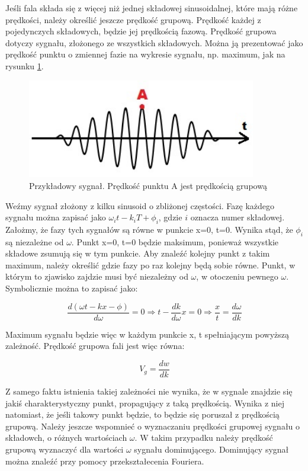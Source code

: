 Jeśli fala składa się z więcej niż jednej składowej sinusoidalnej, które mają różne prędkości, należy określić jeszcze prędkość grupową.  Prędkość każdej z pojedynczych składowych, będzie jej prędkością fazową. Prędkość grupowa dotyczy sygnału, złożonego ze wszystkich składowych. Można ją prezentować jako prędkość punktu o zmiennej fazie na wykresie sygnału, np. maximum, jak na rysunku \ref{fig:przykladowy_sygnal}.

\begin{figure}[h]
\centering
\includegraphics[width=10cm]{Zdjecia/2/predkosc_grupowa_wierzcholek}
\caption{Przykładowy sygnał. Prędkość punktu A jest prędkością grupową}
\label{fig:przykladowy_sygnal}
\end{figure}

Weźmy sygnał złożony z kilku sinusoid o zbliżonej częstości. Fazę każdego sygnału można zapisać jako \( \omega_i t - k_i T + \phi_i \), gdzie \( i\) oznacza numer składowej. Założmy, że fazy tych sygnałów są równe w punkcie x=0, t=0. Wynika stąd, że \( \phi_i \) są niezależne od \( \omega \). Punkt x=0, t=0 będzie maksimum, ponieważ wszystkie składowe zsumują się w tym punkcie. Aby znaleźć kolejny punkt z takim maximum, należy określić gdzie fazy po raz kolejny będą sobie równe.  Punkt, w którym to zjawisko zajdzie musi być niezależny od \( \omega \), w otoczeniu pewnego \( \omega \). Symbolicznie można to zapisać jako:

\begin{equation}
\frac{d(\omega t - kx - \phi)}{d\omega}=0 \Rightarrow t-\frac{dk}{d\omega}x=0 \Rightarrow \frac{x}{t}=\frac{d\omega}{dk}
\end{equation}

Maximum sygnału będzie więc w każdym punkcie x, t spełniającym powyższą zależność. Prędkość grupowa fali jest więc równa:

\begin{equation}
V_g=\frac{dw}{dk}
\end{equation}

Z samego faktu istnienia takiej zależności nie wynika, że w sygnale znajdzie się jakiś charakterystyczny punkt, propagujący z taką prędkością. Wynika z niej natomiast, że jeśli takowy punkt będzie, to będzie się poruszał z prędkością grupową. Należy jeszcze wspomnieć o wyznaczaniu prędkości grupowej sygnału o składowch, o różnych wartościach \( \omega \). W takim przypadku należy prędkość grupową wyznaczyć dla wartości \(\omega\) sygnału dominującego. Dominujący sygnał można znaleźć przy pomocy przekształecenia Fouriera.

